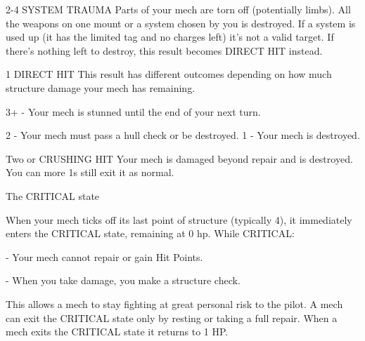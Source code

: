  2-4             SYSTEM TRAUMA            Parts of your mech are torn off (potentially limbs). All the weapons  
                                          on one mount or a system chosen by you is destroyed. If a system  
                                          is used up (it has the limited tag and no charges left) it’s not a valid  
                                          target. If there’s nothing left to destroy, this result becomes DIRECT  
                                          HIT instead. 

 1               DIRECT HIT               This result has different outcomes depending on how much  
                                          structure damage your mech has remaining.
 
                                          3+ - Your mech is stunned until the end of your next turn.
 
                                          2 - Your mech must pass a hull check or be destroyed.  
                                          1 - Your mech is destroyed. 

 Two or          CRUSHING HIT             Your mech is damaged beyond repair and is destroyed. You can  
 more 1s                                  still exit it as normal. 

                                              The CRITICAL state
 

When your mech ticks off its last point of structure (typically 4), it immediately enters the  
CRITICAL state, remaining at 0 hp. While CRITICAL:
 
             -    Your mech cannot repair or gain Hit Points.
 
             -    When you take damage, you make a structure check.
 
This allows a mech to stay fighting at great personal risk to the pilot. A mech can exit the  
CRITICAL state only by resting or taking a full repair. When a mech exits the CRITICAL state it  
returns to 1 HP.
 

                                                                                                                   

